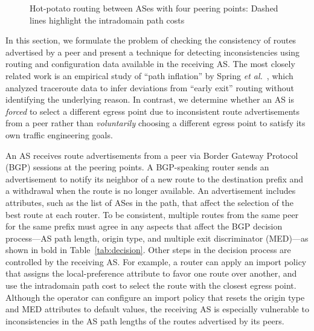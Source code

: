 \begin{figure}[h!]
\centerline{}
\caption[Hot-potato routing between ASes]{Hot-potato routing between
ASes with four peering points: 
  Dashed lines highlight the intradomain path costs} 
\label{fig:hotpotato}
\end{figure}


In this section, we formulate the problem of checking the consistency of
routes advertised by a peer and present a technique for detecting
inconsistencies using routing and configuration data available in the
receiving AS.  The most closely related work is an empirical study of ``path
inflation'' by Spring {\em et al.}~\cite{Spring2003}, which analyzed
traceroute data to infer deviations 
from ``early exit'' routing without identifying the underlying
reason. 
In contrast, we determine whether an AS is {\em forced\/} to select a
different egress point due to inconsistent route advertisements from a
peer rather than {\em voluntarily\/} choosing a different egress point
to satisfy its own traffic engineering goals.

An AS receives route advertisements from a peer via Border Gateway
Protocol (BGP) sessions at the peering points.  
A BGP-speaking router sends an advertisement to notify its neighbor of
a new route to the destination prefix and a withdrawal when the route
is no longer available.  An advertisement includes attributes, such as
the list of ASes in the path, that affect the selection of the best
route at each router.  To be consistent, multiple routes from the same
peer for the same prefix must agree in any aspects that affect the BGP
decision process---AS path length, origin type, and multiple exit
discriminator (MED)---as shown in bold in Table~\ref{tab:decision}.
Other steps in the decision process are controlled by the receiving
AS.  For example, a router can apply an import policy that assigns the
local-preference attribute to favor one route over another, and use
the intradomain path cost to select the route with the closest egress
point.  Although the operator can configure an import policy that
resets the origin type and MED attributes to default values, the
receiving AS is especially vulnerable to inconsistencies in the AS
path lengths of the routes advertised by its peers.


